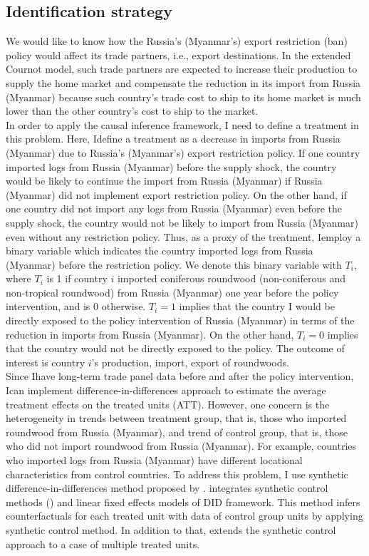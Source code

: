 \documentclass[a4paper,12pt]{article}
\begin{document}
\subsection{Identification strategy}

We would like to know how the Russia's (Myanmar's) export restriction (ban) policy would affect its trade partners, i.e., export destinations. In the extended Cournot model, such trade partners are expected to increase their production to supply the home market and compensate the reduction in its import from Russia (Myanmar) because such country's trade cost to ship to its home market is much lower than the other country's cost to ship to the market. \\

In order to apply the causal inference framework, I need to define a treatment in this problem. Here, Idefine a treatment as a decrease in imports from Russia (Myanmar) due to Russia's (Myanmar's) export restriction policy. If one country imported logs from Russia (Myanmar) before the supply shock, the country would be likely to continue the import from Russia (Myanmar) if Russia (Myanmar) did not implement export restriction policy. On the other hand, if one country did not import any logs from Russia (Myanmar) even before the supply shock, the country would not be likely to import from Russia (Myanmar) even without any restriction policy. Thus, as a proxy of the treatment, Iemploy a binary variable which indicates the country imported logs from Russia (Myanmar) before the restriction policy. We denote this binary variable with $T_i$, where $T_i$ is 1 if country $i$ imported coniferous roundwood (non-coniferous and non-tropical roundwood) from Russia (Myanmar) one year before the policy intervention, and is 0 otherwise. $T_i = 1$ implies that the country I would be directly exposed to the policy intervention of Russia (Myanmar) in terms of the reduction in imports from Russia (Myanmar). On the other hand, $T_i = 0$ implies that the country would not be directly exposed to the policy. The outcome of interest is country $i$'s production, import, export of roundwoods.\\

Since Ihave long-term trade panel data before and after the policy intervention, Ican implement difference-in-differences approach to estimate the average treatment effects on the treated units (ATT). However, one concern is the heterogeneity in trends between treatment group, that is, those who imported roundwood from Russia (Myanmar), and trend of control group, that is, those who did not import roundwood from Russia (Myanmar). For example, countries who imported logs from Russia (Myanmar) have different locational characteristics from control countries. To address this problem, I use synthetic difference-in-differences method proposed by \cite{xu2017generalized}. \cite{xu2017generalized} integrates synthetic control methods (\cite{abadie2010synthetic}) and linear fixed effects models of DID framework. This method infers counterfactuals for each treated unit with data of control group units by applying synthetic control method. In addition to that, \cite{xu2017generalized} extends the synthetic control approach to a case of multiple treated units.\\ 
\end{document}
